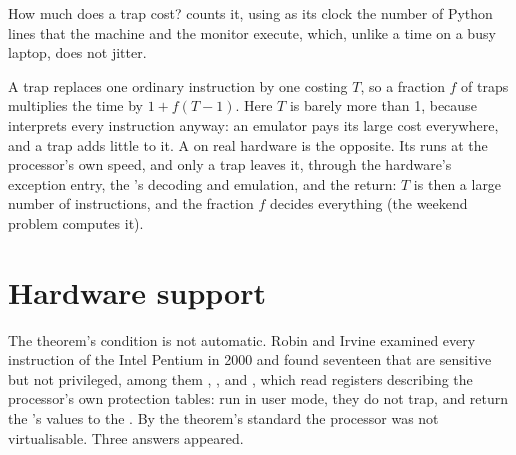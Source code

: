 \label{lst:b3:virtualisation:run}

\label{out:b3:virtualisation:run}

How much does a trap cost?  counts it, using as its clock the number of Python lines that the machine and the monitor execute, which, unlike a time on a busy laptop, does not jitter.

\label{lst:b3:virtualisation:cost}

\label{out:b3:virtualisation:cost}

A trap replaces one ordinary instruction by one costing $T$, so a fraction $f$ of traps multiplies the time by $1 + f(T - 1)$. Here $T$ is barely more than 1, because  interprets every instruction anyway: an emulator pays its large cost everywhere, and a trap adds little to it. A  on real hardware is the opposite. Its  runs at the processor's own speed, and only a trap leaves it, through the hardware's exception entry, the 's decoding and emulation, and the return: $T$ is then a large number of instructions, and the fraction $f$ decides everything (the weekend problem computes it).

\section{Hardware support}\label{sec:b3:virtualisation:hardware}

The theorem's condition is not automatic. Robin and Irvine examined every instruction of the Intel Pentium in 2000 and found seventeen that are sensitive but not privileged, among them , ,  and , which read registers describing the processor's own protection tables: run in user mode, they do not trap, and return the 's values to the . By the theorem's standard the processor was not virtualisable. %
Three answers appeared.

